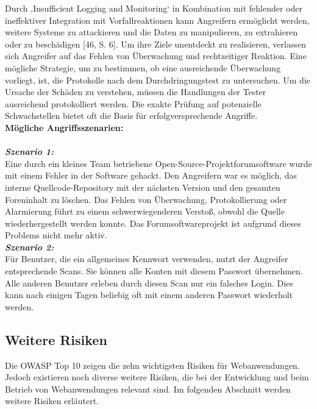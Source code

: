 Durch ‚Insufficient Logging and Monitoring‘ in Kombination mit fehlender oder ineffektiver Integration mit Vorfallreaktionen kann Angreifern ermöglicht werden, weitere Systeme zu attackieren und die Daten zu manipulieren, zu extrahieren oder zu beschädigen [46, S. 6]. Um ihre Ziele unentdeckt zu realisieren, verlassen sich Angreifer auf das Fehlen von Überwachung und rechtzeitiger Reaktion. Eine mögliche Strategie, um zu bestimmen, ob eine ausreichende Überwachung vorliegt, ist, die Protokolle nach dem Durchdringungstest zu untersuchen. Um die Ursache der Schäden zu verstehen, müssen die Handlungen der Tester ausreichend protokolliert werden. Die exakte Prüfung auf potenzielle Schwachstellen bietet oft die Basis für erfolgversprechende Angriffe\cite[16]{owasp17top10}.\\

\textbf{Mögliche Angriffsszenarien:}\\
\\
\textbf{\textit{Szenario 1:}}\\

Eine durch ein kleines Team betriebene Open-Source-Projektforumsoftware wurde mit einem Fehler in der Software gehackt. Den Angreifern war es möglich, das interne Quellcode-Repository mit der nächsten Version und den gesamten Foreninhalt zu löschen. Das Fehlen von Überwachung, Protokollierung oder Alarmierung führt zu einem schwerwiegenderen Verstoß, obwohl die Quelle wiederhergestellt werden konnte. Das Forumsoftwareprojekt ist aufgrund dieses Problems nicht mehr aktiv\cite[16]{owasp17top10}.\\

\textbf{\textit{Szenario 2:}}\\

Für Benutzer, die ein allgemeines Kennwort verwenden, nutzt der Angreifer entsprechende Scans. Sie können alle Konten mit diesem Passwort übernehmen. Alle anderen Benutzer erleben durch diesen Scan nur ein falsches Login. Dies kann nach einigen Tagen beliebig oft mit einem anderen Passwort wiederholt werden\cite[16]{owasp17top10}.\\

\subsection{Weitere Risiken}

Die OWASP Top 10 zeigen die zehn wichtigsten Risiken für Webanwendungen. Jedoch existieren noch diverse weitere Risiken, die bei der Entwicklung und beim Betrieb von Webanwendungen relevant sind. Im folgenden Abschnitt werden weitere Risiken erläutert.

